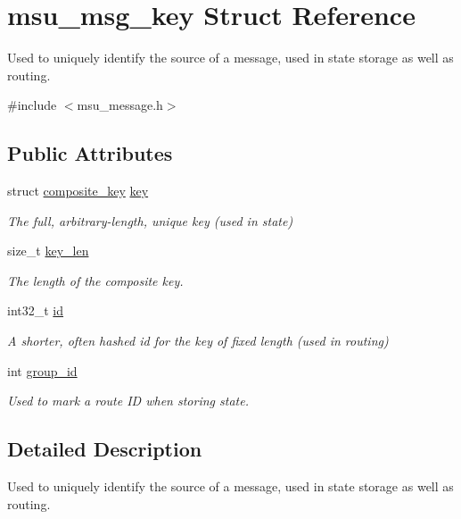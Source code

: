 \hypertarget{structmsu__msg__key}{\section{msu\-\_\-msg\-\_\-key Struct Reference}
\label{structmsu__msg__key}
}


Used to uniquely identify the source of a message, used in state storage as well as routing.  




{\ttfamily \#include $<$msu\-\_\-message.\-h$>$}

\subsection*{Public Attributes}
\begin{DoxyCompactItemize}
\item 
struct \hyperlink{structcomposite__key}{composite\-\_\-key} \hyperlink{structmsu__msg__key_ad443ba50619f77048500191f4296571e}{key}
\begin{DoxyCompactList}\small\item\em The full, arbitrary-\/length, unique key (used in state) \end{DoxyCompactList}\item 
size\-\_\-t \hyperlink{structmsu__msg__key_ac144c1faa26d9e6701acb2ef3282e7d5}{key\-\_\-len}
\begin{DoxyCompactList}\small\item\em The length of the composite key. \end{DoxyCompactList}\item 
int32\-\_\-t \hyperlink{structmsu__msg__key_afb9b6ad4c4a66b7c984e54e508073976}{id}
\begin{DoxyCompactList}\small\item\em A shorter, often hashed id for the key of fixed length (used in routing) \end{DoxyCompactList}\item 
int \hyperlink{structmsu__msg__key_abd3cdf7b3585111dd56ca9ceba361dba}{group\-\_\-id}
\begin{DoxyCompactList}\small\item\em Used to mark a route I\-D when storing state. \end{DoxyCompactList}\end{DoxyCompactItemize}


\subsection{Detailed Description}
Used to uniquely identify the source of a message, used in state storage as well as routing. 

